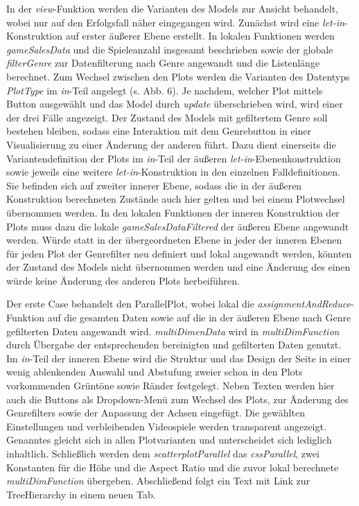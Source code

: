 \documentclass[usegeometry=true]{scrartcl}
\begin{document}
In der \textit{view}-Funktion werden die Varianten des Models zur Ansicht behandelt, wobei nur auf den Erfolgsfall näher eingegangen wird. 
Zunächst wird eine \textit{let-in}-Konstruktion auf erster äußerer Ebene erstellt. 
In lokalen Funktionen werden \textit{gameSalesData} und die Spieleanzahl insgesamt beschrieben 
sowie der globale \textit{filterGenre} zur Datenfilterung nach Genre angewandt und die Listenlänge berechnet. 
Zum Wechsel zwischen den Plots werden die Varianten des Datentyps \textit{PlotType} im \textit{in}-Teil angelegt (s. Abb. 6). 
Je nachdem, welcher Plot mittels Button ausgewählt und das Model durch \textit{update} überschrieben wird, wird einer der drei Fälle angezeigt. 
Der Zustand des Models mit gefiltertem Genre soll bestehen bleiben, 
sodass eine Interaktion mit dem Genrebutton in einer Visualisierung zu einer Änderung der anderen führt.
Dazu dient einerseits die Variantendefinition der Plots im \textit{in}-Teil der äußeren \textit{let-in}-Ebenenkonstruktion 
sowie jeweils eine weitere \textit{let-in}-Konstruktion in den einzelnen Falldefinitionen.
Sie befinden sich auf zweiter innerer Ebene, sodass die in der äußeren Konstruktion berechneten Zustände auch hier gelten 
und bei einem Plotwechsel übernommen werden. 
In den lokalen Funktionen der inneren Konstruktion der Plots muss dazu die lokale \textit{gameSalesDataFiltered} der äußeren Ebene angewandt werden. 
Würde statt in der übergeordneten Ebene in jeder der inneren Ebenen für jeden Plot der Genrefilter neu definiert und lokal angewandt werden, 
könnten der Zustand des Models nicht übernommen werden und eine Änderung des einen würde keine Änderung des anderen Plots herbeiführen.

Der erste Case behandelt den ParallelPlot, wobei lokal die \textit{assignmentAndReduce}-Funktion auf die gesamten Daten 
sowie auf die in der äußeren Ebene nach Genre gefilterten Daten angewandt wird.
\textit{multiDimenData} wird in \textit{multiDimFunction} durch Übergabe der entsprechenden bereinigten und gefilterten Daten genutzt. 
Im \textit{in}-Teil der inneren Ebene wird die Struktur und das Design der Seite in einer wenig ablenkenden Auswahl und Abstufung zweier 
schon in den Plots vorkommenden Grüntöne sowie Ränder festgelegt.
Neben Texten werden hier auch die Buttons als Dropdown-Menü zum Wechsel des Plots, 
zur Änderung des Genrefilters sowie der Anpassung der Achsen eingefügt.
Die gewählten Einstellungen und verbleibenden Videospiele werden transparent angezeigt.
Genanntes gleicht sich in allen Plotvarianten und unterscheidet sich lediglich inhaltlich.
Schließlich werden dem \textit{scatterplotParallel} das \textit{cssParallel}, zwei Konstanten für die Höhe und die Aspect Ratio 
und die zuvor lokal berechnete \textit{multiDimFunction} übergeben.
Abschließend folgt ein Text mit Link zur TreeHierarchy in einem neuen Tab.
\end{document}
